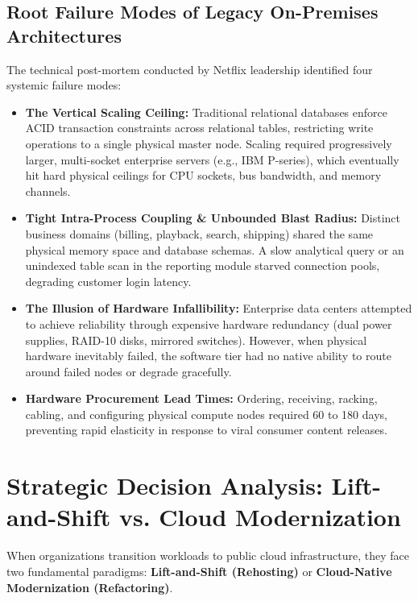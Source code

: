 \documentclass[11pt,a4paper]{article}
\begin{document}
\subsection{Root Failure Modes of Legacy On-Premises Architectures}
The technical post-mortem conducted by Netflix leadership identified four systemic failure modes:
\begin{itemize}[leftmargin=*]
    \item \textbf{The Vertical Scaling Ceiling:} Traditional relational databases enforce ACID transaction constraints across relational tables, restricting write operations to a single physical master node. Scaling required progressively larger, multi-socket enterprise servers (e.g., IBM P-series), which eventually hit hard physical ceilings for CPU sockets, bus bandwidth, and memory channels.
    \item \textbf{Tight Intra-Process Coupling \& Unbounded Blast Radius:} Distinct business domains (billing, playback, search, shipping) shared the same physical memory space and database schemas. A slow analytical query or an unindexed table scan in the reporting module starved connection pools, degrading customer login latency.
    \item \textbf{The Illusion of Hardware Infallibility:} Enterprise data centers attempted to achieve reliability through expensive hardware redundancy (dual power supplies, RAID-10 disks, mirrored switches). However, when physical hardware inevitably failed, the software tier had no native ability to route around failed nodes or degrade gracefully.
    \item \textbf{Hardware Procurement Lead Times:} Ordering, receiving, racking, cabling, and configuring physical compute nodes required 60 to 180 days, preventing rapid elasticity in response to viral consumer content releases.
\end{itemize}

\newpage

\section{Strategic Decision Analysis: Lift-and-Shift vs. Cloud Modernization}

When organizations transition workloads to public cloud infrastructure, they face two fundamental paradigms: \textbf{Lift-and-Shift (Rehosting)} or \textbf{Cloud-Native Modernization (Refactoring)}.
\end{document}
